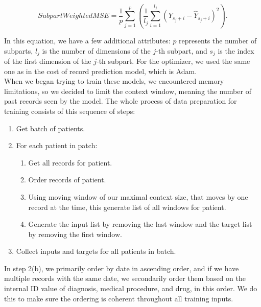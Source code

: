 \begin{equation}
	\label{eqn:swmse}
	SubpartWeightedMSE = \frac{1}{p} \sum_{j=1}^{p}(\frac{1}{l_j}\sum_{i=1}^{l_j}(Y_{s_j+i}-\hat{Y}_{s_j+i})^2).
\end{equation} 

In this equation, we have a few additional attributes: $p$ represents the number of subparts, $l_j$ is the number of dimensions of the $j$-th subpart, and $s_j$ is the index of the first dimension of the $j$-th subpart. For the optimizer, we used the same one as in the cost of record prediction model, which is Adam.
\\

When we began trying to train these models, we encountered memory limitations, so we decided to limit the context window, meaning the number of past records seen by the model. The whole process of data preparation for training consists of this sequence of steps:

\begin{enumerate}
	\item Get batch of patients.
	\item For each patient in patch:
	\begin{enumerate}
		\item Get all records for patient.
		\item Order records of patient.
		\item Using moving window of our maximal context size, that moves by one record at the time, this generate list of all windows for patient.
		\item Generate the input list by removing the last window and the target list by removing the first window.
	\end{enumerate}
	\item Collect inputs and targets for all patients in batch.
\end{enumerate}

In step 2(b), we primarily order by date in ascending order, and if we have multiple records with the same date, we secondarily order them based on the internal ID value of diagnosis, medical procedure, and drug, in this order. We do this to make sure the ordering is coherent throughout all training inputs.
\\ 

